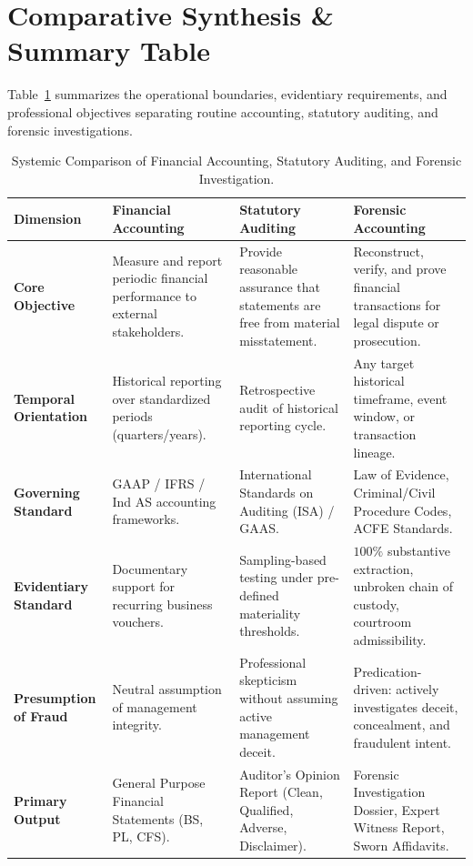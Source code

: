 \section{Comparative Synthesis \& Summary Table}

Table~\ref{tab:comparison_accounting_disciplines} summarizes the operational boundaries, evidentiary requirements, and professional objectives separating routine accounting, statutory auditing, and forensic investigations.

\begin{table}[htbp]
\centering
\small
\begin{tabularx}{\textwidth}{lXXX}
\toprule
\textbf{Dimension} & \textbf{Financial Accounting} & \textbf{Statutory Auditing} & \textbf{Forensic Accounting} \\
\midrule
\textbf{Core Objective} & Measure and report periodic financial performance to external stakeholders. & Provide reasonable assurance that statements are free from material misstatement. & Reconstruct, verify, and prove financial transactions for legal dispute or prosecution. \\
\addlinespace
\textbf{Temporal Orientation} & Historical reporting over standardized periods (quarters/years). & Retrospective audit of historical reporting cycle. & Any target historical timeframe, event window, or transaction lineage. \\
\addlinespace
\textbf{Governing Standard} & GAAP / IFRS / Ind AS accounting frameworks. & International Standards on Auditing (ISA) / GAAS. & Law of Evidence, Criminal/Civil Procedure Codes, ACFE Standards. \\
\addlinespace
\textbf{Evidentiary Standard} & Documentary support for recurring business vouchers. & Sampling-based testing under pre-defined materiality thresholds. & $100\%$ substantive extraction, unbroken chain of custody, courtroom admissibility. \\
\addlinespace
\textbf{Presumption of Fraud} & Neutral assumption of management integrity. & Professional skepticism without assuming active management deceit. & Predication-driven: actively investigates deceit, concealment, and fraudulent intent. \\
\addlinespace
\textbf{Primary Output} & General Purpose Financial Statements (BS, PL, CFS). & Auditor's Opinion Report (Clean, Qualified, Adverse, Disclaimer). & Forensic Investigation Dossier, Expert Witness Report, Sworn Affidavits. \\
\bottomrule
\end{tabularx}
\caption{Systemic Comparison of Financial Accounting, Statutory Auditing, and Forensic Investigation.}
\label{tab:comparison_accounting_disciplines}
\end{table}

